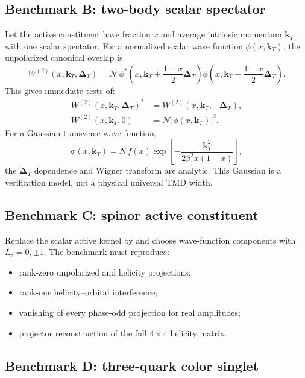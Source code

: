 \documentclass[11pt]{article}
\newcommand{\kT}{\bm{k}_{T}}
\newcommand{\DT}{\bm{\Delta}_{T}}
\newcommand{\cN}{\mathcal N}
\begin{document}
\subsection{Benchmark B: two-body scalar spectator}

Let the active constituent have fraction \(x\) and average intrinsic momentum
\(\kT\), with one scalar spectator.  For a normalized scalar wave function
\(\phi(x,\kT)\), the unpolarized canonical overlap is
\begin{equation}
 W^{(2)}(x,\kT,\DT)
 =\cN\,
 \phi^*\!\left(x,\kT+\frac{1-x}{2}\DT\right)
 \phi\!\left(x,\kT-\frac{1-x}{2}\DT\right).
\label{eq:two-body-benchmark}
\end{equation}
This gives immediate tests of:
\begin{align}
 W^{(2)}(x,\kT,\DT)^*&=W^{(2)}(x,\kT,-\DT),
\label{eq:two-body-hermiticity}\\
 W^{(2)}(x,\kT,0)&=\cN|\phi(x,\kT)|^2.
\label{eq:two-body-forward}
\end{align}
For a Gaussian transverse wave function,
\begin{equation}
 \phi(x,\kT)
 =N\,f(x)\exp\!\left[-\frac{\kT^2}{2\beta^2x(1-x)}\right],
\label{eq:gaussian-benchmark}
\end{equation}
the \(\DT\) dependence and Wigner transform are analytic.  This Gaussian is
a verification model, not a physical universal TMD width.

\subsection{Benchmark C: spinor active constituent}

Replace the scalar active kernel by
 and choose
wave-function components with \(L_z=0,\pm1\).  The benchmark must reproduce:
\begin{itemize}
\item rank-zero unpolarized and helicity projections;
\item rank-one helicity--orbital interference;
\item vanishing of every phase-odd projection for real amplitudes;
\item projector reconstruction of the full \(4\times4\) helicity matrix.
\end{itemize}

\subsection{Benchmark D: three-quark color singlet}
\end{document}
